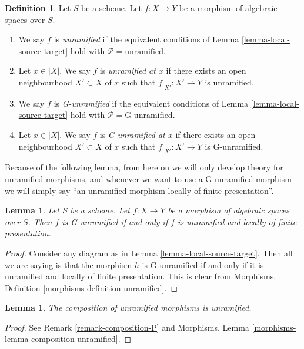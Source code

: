 \documentclass{stacks-project}
\theoremstyle{plain}
\newtheorem{lemma}[subsection]{Lemma}
\theoremstyle{definition}
\newtheorem{definition}[subsection]{Definition}
\theoremstyle{remark}
\numberwithin{equation}{subsection}
\begin{document}
\begin{definition}
\label{definition-unramified}
Let $S$ be a scheme.
Let $f : X \to Y$ be a morphism of algebraic spaces over $S$.
\begin{enumerate}
\item We say $f$ is {\it unramified} if the equivalent conditions of
Lemma \ref{lemma-local-source-target}
hold with $\mathcal{P} = \text{unramified}$.
\item Let $x \in |X|$. We say $f$ is {\it unramified at $x$} if there
exists an open neighbourhood $X' \subset X$ of $x$ such that
$f|_{X'} : X' \to Y$ is unramified.
\item We say $f$ is {\it G-unramified} if the equivalent conditions of
Lemma \ref{lemma-local-source-target}
hold with $\mathcal{P} = \text{G-unramified}$.
\item Let $x \in |X|$. We say $f$ is {\it G-unramified at $x$} if there
exists an open neighbourhood $X' \subset X$ of $x$ such that
$f|_{X'} : X' \to Y$ is G-unramified.
\end{enumerate}
\end{definition}

\noindent
Because of the following lemma, from here on we will only develop theory
for unramified morphisms, and whenever we want to use a G-unramified
morphism we will simply say ``an unramified morphism locally of finite
presentation''.

\begin{lemma}
\label{lemma-unramified-G-unramified}
Let $S$ be a scheme.
Let $f : X \to Y$ be a morphism of algebraic spaces over $S$.
Then $f$ is G-unramified if and only if $f$ is unramified and
locally of finite presentation.
\end{lemma}

\begin{proof}
Consider any diagram as in
Lemma \ref{lemma-local-source-target}.
Then all we are saying is that the morphism $h$ is
G-unramified if and only if it is unramified and locally of finite
presentation. This is clear from
Morphisms, Definition \ref{morphisms-definition-unramified}.
\end{proof}

\begin{lemma}
\label{lemma-composition-unramified}
The composition of unramified morphisms is unramified.
\end{lemma}

\begin{proof}
See Remark \ref{remark-composition-P} and
Morphisms, Lemma \ref{morphisms-lemma-composition-unramified}.
\end{proof}
\end{document}
